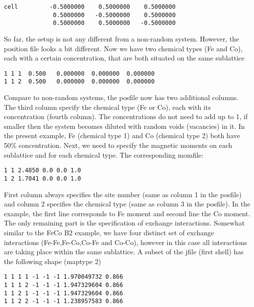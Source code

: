 \documentclass[11pt,fleqn,a4]{book} %
\begin{document}
\begin{fBox} 
\begin{Verbatim}
cell         -0.5000000    0.5000000    0.5000000
              0.5000000   -0.5000000    0.5000000
              0.5000000    0.5000000   -0.5000000
\end{Verbatim}
\end{fBox}

So far, the setup is not any different from a non-random system. However, the position file looks a bit different. Now we have two chemical types (Fe and Co), each with a certain concentration, that are both situated on the same sublattice

\begin{fBox} 
\begin{Verbatim}
1 1 1  0.500   0.000000  0.000000  0.000000
1 1 2  0.500   0.000000  0.000000  0.000000
\end{Verbatim}
\end{fBox}

Compare to non-random systems, the posfile now has two additional columns. The third column specify the chemical type (Fe or Co), each with its concentration (fourth column). The concentrations do not need to add up to 1, if smaller then the system becomes diluted with random voids (vacancies) in it. In the present example, Fe (chemical type 1) and Co (chemical type 2) both have 50\% concentration. Next, we need to specify the magnetic moments on each sublattice and for each chemical type. The corresponding momfile:

\begin{fBox} 
\begin{Verbatim}
1 1 2.4850 0.0 0.0 1.0
1 2 1.7041 0.0 0.0 1.0
\end{Verbatim}
\end{fBox}

First column always specifies the site number (same as column 1 in the posfile) and column 2 specifies the chemical type (same as column 3 in the posfile). In the example, the first line corresponds to Fe moment and second line the Co moment. The only remaining part is the specification of exchange interactions. Somewhat similar to the FeCo B2 example, we have four distinct set of exchange interactions (Fe-Fe,Fe-Co,Co-Fe and Co-Co), however in this case all interactions are taking place within the same sublattice. A subset of the jfile (first shell) has the following shape (maptype 2)

\begin{fBox} 
\begin{Verbatim}
1 1 1 1 -1 -1 -1 1.970049732 0.866
1 1 1 2 -1 -1 -1 1.947329604 0.866
1 1 2 1 -1 -1 -1 1.947329604 0.866
1 1 2 2 -1 -1 -1 1.238957583 0.866
\end{Verbatim}
\end{fBox}
\end{document}
